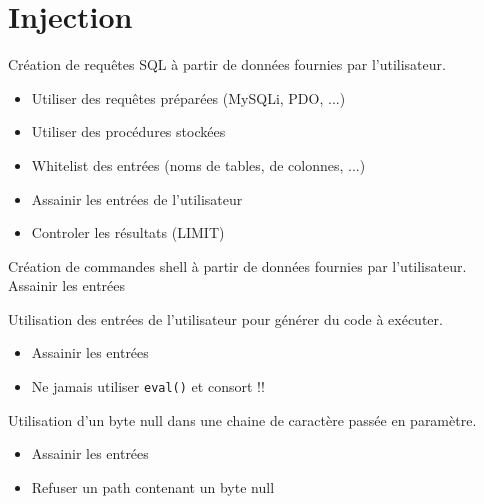 \documentclass[a4paper]{article}
\begin{document}
\section{Injection}





\begin{attaque}
    Création de requêtes SQL à partir de données fournies par l’utilisateur.
    \begin{itemize}
        \item Utiliser des requêtes préparées (MySQLi, PDO, ...)
        \item Utiliser des procédures stockées
        \item Whitelist des entrées (noms de tables, de colonnes, ...)
        \item Assainir les entrées de l’utilisateur
        \item Controler les résultats (LIMIT)
    \end{itemize}
\end{attaque}

\begin{attaque}
    Création de commandes shell à partir de données fournies par l’utilisateur.
    Assainir les entrées
\end{attaque}

\begin{attaque}
    Utilisation des entrées de l’utilisateur pour générer du code à exécuter.
    \begin{itemize}
        \item Assainir les entrées
        \item Ne jamais utiliser \texttt{eval()} et consort !!
    \end{itemize}
\end{attaque}

\begin{attaque}
    Utilisation d’un byte null dans une chaine de caractère passée en paramètre.
    \begin{itemize}
        \item Assainir les entrées
        \item Refuser un path contenant un byte null
    \end{itemize}
\end{attaque}
\end{document}
